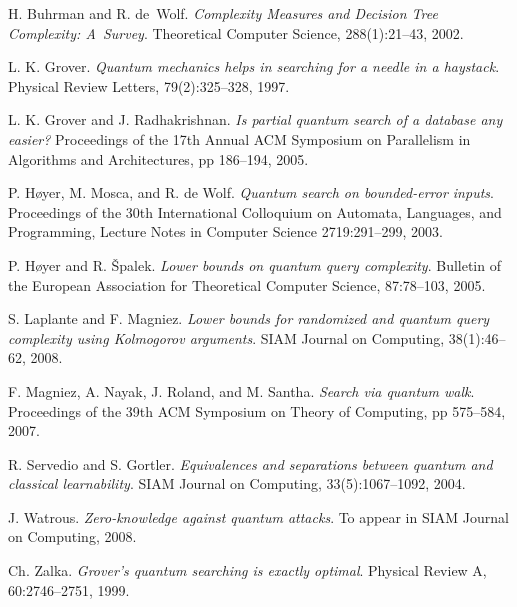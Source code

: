 \documentclass{article}
\begin{document}
\begin{thebibliography}{99}
%
 H. Buhrman and R. de~Wolf.
\emph{Complexity Measures and Decision Tree Complexity: {A}~Survey}.
Theoretical Computer Science, 288(1):21--43, 2002. 

%
 L. K. Grover. 
\emph{Quantum mechanics helps in searching for a needle in a haystack}. 
Physical Review Letters, 79(2):325--328, 1997.

%
 L. K. Grover and J. Radhakrishnan. 
\emph{Is partial quantum search of a database any easier?}
Proceedings of the 17th Annual ACM Symposium on Parallelism 
in Algorithms and Architectures,
pp 186--194, 2005.

%
 P. H\o yer, M. Mosca, and R. de Wolf. 
\emph{Quantum search on bounded-error inputs}. 
Proceedings of the 30th International
Colloquium on Automata, Languages, and Programming, 
Lecture Notes in Computer Science 2719:291--299, 2003.

%
 P. H\o yer and R. \v{S}palek. 
\emph{Lower bounds on quantum query complexity}. 
Bulletin of the European Association for Theoretical Computer Science, 
87:78--103, 2005.

%
 S. Laplante and F. Magniez. 
\emph{Lower bounds for randomized
and quantum query complexity using Kolmogorov arguments}.
SIAM Journal on Computing, 38(1):46--62, 2008.

%
 F. Magniez, A. Nayak, J. Roland, and M. Santha. 
\emph{Search via quantum walk}. 
Proceedings of the 39th ACM Symposium on Theory of Computing, pp 575--584, 2007.

%
 R. Servedio and S. Gortler. \emph{Equivalences and separations
between quantum and classical learnability}. 
SIAM Journal on Computing, 33(5):1067--1092, 2004.

%
 J. Watrous. \emph{Zero-knowledge against quantum attacks}.
To appear in SIAM Journal on Computing, 2008.

%
 Ch. Zalka. 
\emph{Grover's quantum searching is exactly optimal}. 
Physical Review A, 60:2746--2751, 1999.


\end{thebibliography}
\end{document}
